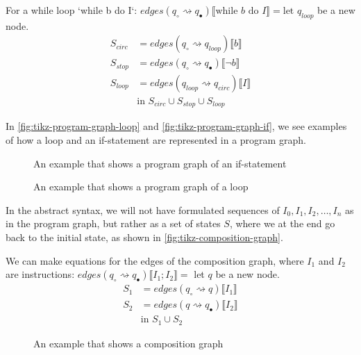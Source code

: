 For a while loop `while b do I`:
$edges(q_{\circ} \rightsquigarrow q_{\bullet})\llbracket \text{while } b \text{ do } I \rrbracket = \text{let } q_{loop}$ be a new node.
\begin{align}
    S_{circ} &= edges(q_\circ \rightsquigarrow q_{loop}) \llbracket b \rrbracket \\
    S_{stop} &= edges(q_{\circ} \rightsquigarrow q_{\bullet})\llbracket \neg b \rrbracket \\
    S_{loop} &= edges(q_{loop} \rightsquigarrow q_{circ})\llbracket I \rrbracket \\
    &\text{in } S_{circ} \cup S_{stop} \cup S_{loop}
\end{align}

In \autoref{fig:tikz-program-graph-loop} and \autoref{fig:tikz-program-graph-if}, we see examples of how a loop and an if-statement are represented in a program graph.

\begin{figure}[htb!]
    \center
    
    \caption{An example that shows a program graph of an if-statement}
    \label{fig:tikz-program-graph-if}
\end{figure}

\begin{figure}[htb!]
    \center
    
    \caption{An example that shows a program graph of a loop}
    \label{fig:tikz-program-graph-loop}
\end{figure}

In the abstract syntax, we will not have formulated sequences of $I_0, I_1, I_2, \dots, I_n$ as in the program graph, but rather as a set of states $S$, where we at the end go back to the initial state, as shown in \autoref{fig:tikz-composition-graph}.

We can make equations for the edges of the composition graph, where $I_1$ and $I_2$ are instructions:
$edges(q_{\circ} \rightsquigarrow q_{\bullet})\llbracket I_1 ; I_2 \rrbracket = $ let $q$ be a new node.
\begin{align}
    S_1 &= edges(q_{\circ} \rightsquigarrow q)\llbracket I_1 \rrbracket \\
    S_2 &= edges(q \rightsquigarrow q_{\bullet})\llbracket I_2 \rrbracket \\
    &\text{in } S_1 \cup S_2
\end{align}

\begin{figure}
    \center
    
    \caption{An example that shows a composition graph}
    \label{fig:tikz-composition-graph}
\end{figure}

